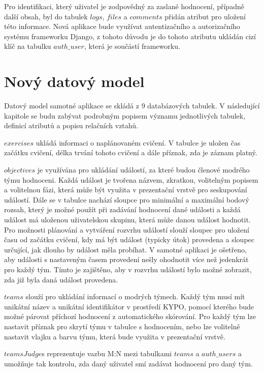 \documentclass[
  digital, %
  twoside, %
  table,   %
  lof,     %
  lot,     %
]{fithesis3}
\begin{document}
Pro identifikaci, který uživatel je zodpovědný za zaslané hodnocení, případně další obsah, byl do tabulek $logs$, $files$ a $comments$ přidán atribut pro uložení této informace. Nová aplikace bude využívat autentizačního a autorizačního systému frameworku Django, z tohoto důvodu je do tohoto atributu ukládán cizí klíč na tabulku $auth\_user$, která je součástí frameworku.

\section{Nový datový model}

Datový model samotné aplikace se skládá z 9 databázových tabulek. V následující kapitole se budu zabývat podrobným popisem významu jednotlivých tabulek, definicí atributů a popisu relačních vztahů.

$exercises$ ukládá informaci o naplánovaném cvičení. V tabulce je uložen čas začátku cvičení, délka trvání tohoto cvičení a dále příznak, zda je záznam platný.

$objectives$ je využívána pro ukládání událostí, za které budou členové modrého týmu hodnoceni. Každá událost je tvořena názvem, zkratkou, volitelným popisem a volitelnou fázi, která může být využita v prezentační vrstvě pro seskupování událostí. Dále se v tabulce nachází sloupce pro minimální a maximální bodový rozsah, který je možné použít při zadávání hodnocení dané události a každá událost má uloženou uživatelskou skupinu, která může danou událost hodnotit. Pro možnosti plánování a vytváření rozvrhu událostí slouží sloupec pro uložení času od začátku cvičení, kdy má být událost (typicky útok) provedena a sloupec určující, jak dlouho by událost měla probíhat. V samotné aplikaci je ošetřeno, aby události s nastaveným časem provedení nešly ohodnotit více než jedenkrát pro každý tým. Tímto je zajištěno, aby v rozvrhu událostí bylo možné zobrazit, zda již byla daná událost provedena. 

$teams$ slouží pro ukládání informací o modrých týmech. Každý tým musí mít unikátní název a unikátní identifikátor v prostředí KYPO, pomocí kterého bude možné párovat příchozí hodnocení z automatického skórování. Pro každý tým lze nastavit příznak pro skrytí týmu v tabulce s hodnocením, nebo lze volitelně nastavit vlajku a barvu týmu, která bude využita v prezentační vrstvě.

$teamsJudge$s reprezentuje vazbu M:N mezi tabulkami $teams$ a $auth\_users$ a umožňuje tak kontrolu, zda daný uživatel smí zadávat hodnocení pro daný tým. 
\end{document}

